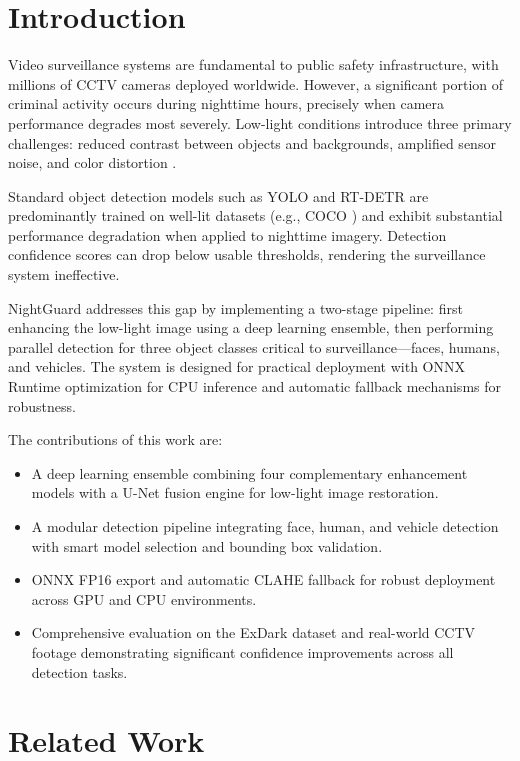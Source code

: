 \documentclass[conference]{IEEEtran}
\begin{document}
\section{Introduction}

Video surveillance systems are fundamental to public safety infrastructure, with millions of CCTV cameras deployed worldwide. However, a significant portion of criminal activity occurs during nighttime hours, precisely when camera performance degrades most severely. Low-light conditions introduce three primary challenges: reduced contrast between objects and backgrounds, amplified sensor noise, and color distortion \cite{b1}.

Standard object detection models such as YOLO \cite{b2} and RT-DETR \cite{b3} are predominantly trained on well-lit datasets (e.g., COCO \cite{b4}) and exhibit substantial performance degradation when applied to nighttime imagery. Detection confidence scores can drop below usable thresholds, rendering the surveillance system ineffective.

NightGuard addresses this gap by implementing a two-stage pipeline: first enhancing the low-light image using a deep learning ensemble, then performing parallel detection for three object classes critical to surveillance---faces, humans, and vehicles. The system is designed for practical deployment with ONNX Runtime optimization for CPU inference and automatic fallback mechanisms for robustness.

The contributions of this work are:
\begin{itemize}
\item A deep learning ensemble combining four complementary enhancement models with a U-Net fusion engine for low-light image restoration.
\item A modular detection pipeline integrating face, human, and vehicle detection with smart model selection and bounding box validation.
\item ONNX FP16 export and automatic CLAHE fallback for robust deployment across GPU and CPU environments.
\item Comprehensive evaluation on the ExDark dataset \cite{b5} and real-world CCTV footage demonstrating significant confidence improvements across all detection tasks.
\end{itemize}

\section{Related Work}
\end{document}
